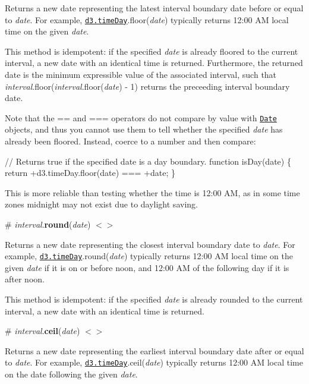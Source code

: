 Returns a new date representing the latest interval boundary date before or equal to {\itshape date}. For example, \href{#timeDay}{\tt d3.\+time\+Day}.floor({\itshape date}) typically returns 12\+:00 AM local time on the given {\itshape date}.

This method is idempotent\+: if the specified {\itshape date} is already floored to the current interval, a new date with an identical time is returned. Furthermore, the returned date is the minimum expressible value of the associated interval, such that {\itshape interval}.floor({\itshape interval}.floor({\itshape date}) -\/ 1) returns the preceeding interval boundary date.

Note that the {\ttfamily ==} and {\ttfamily ===} operators do not compare by value with \href{https://developer.mozilla.org/en-US/docs/Web/JavaScript/Reference/Global_Objects/Date}{\tt Date} objects, and thus you cannot use them to tell whether the specified {\itshape date} has already been floored. Instead, coerce to a number and then compare\+:


\begin{DoxyCode}
// Returns true if the specified date is a day boundary.
function isDay(date) \{
  return +d3.timeDay.floor(date) === +date;
\}
\end{DoxyCode}


This is more reliable than testing whether the time is 12\+:00 AM, as in some time zones midnight may not exist due to daylight saving.

\label{_interval_round}%
\# {\itshape interval}.{\bfseries round}({\itshape date}) \href{https://github.com/d3/d3-time/blob/master/src/interval.js#L16}{\tt $<$$>$}

Returns a new date representing the closest interval boundary date to {\itshape date}. For example, \href{#timeDay}{\tt d3.\+time\+Day}.round({\itshape date}) typically returns 12\+:00 AM local time on the given {\itshape date} if it is on or before noon, and 12\+:00 AM of the following day if it is after noon.

This method is idempotent\+: if the specified {\itshape date} is already rounded to the current interval, a new date with an identical time is returned.

\label{_interval_ceil}%
\# {\itshape interval}.{\bfseries ceil}({\itshape date}) \href{https://github.com/d3/d3-time/blob/master/src/interval.js#L12}{\tt $<$$>$}

Returns a new date representing the earliest interval boundary date after or equal to {\itshape date}. For example, \href{#timeDay}{\tt d3.\+time\+Day}.ceil({\itshape date}) typically returns 12\+:00 AM local time on the date following the given {\itshape date}.

